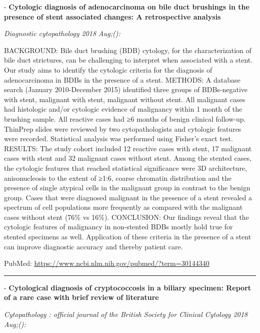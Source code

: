 \documentclass[]{article}
\begin{document}
 - \textbf{Cytologic diagnosis of adenocarcinoma on bile duct brushings
in the presence of stent associated changes: A retrospective analysis}

\emph{Diagnostic cytopathology 2018 Aug;():}

BACKGROUND: Bile duct brushing (BDB) cytology, for the characterization
of bile duct strictures, can be challenging to interpret when associated
with a stent. Our study aims to identify the cytologic criteria for the
diagnosis of adenocarcinoma in BDBs in the presence of a stent. METHODS:
A database search (January 2010-December 2015) identified three groups
of BDBs-negative with stent, malignant with stent, malignant without
stent. All malignant cases had histologic and/or cytologic evidence of
malignancy within 1 month of the brushing sample. All reactive cases had
≥6 months of benign clinical follow-up. ThinPrep slides were reviewed by
two cytopathologists and cytologic features were recorded. Statistical
analysis was performed using Fisher's exact test. RESULTS: The study
cohort included 12 reactive cases with stent, 17 malignant cases with
stent and 32 malignant cases without stent. Among the stented cases, the
cytologic features that reached statistical significance were 3D
architecture, anisonucleosis to the extent of ≥1:6, coarse chromatin
distribution and the presence of single atypical cells in the malignant
group in contrast to the benign group. Cases that were diagnosed
malignant in the presence of a stent revealed a spectrum of cell
populations more frequently as compared with the malignant cases without
stent (76\% vs 16\%). CONCLUSION: Our findings reveal that the cytologic
features of malignancy in non-stented BDBs mostly hold true for stented
specimens as well. Application of these criteria in the presence of a
stent can improve diagnostic accuracy and thereby patient care.

PubMed: \url{https://www.ncbi.nlm.nih.gov/pubmed/?term=30144340}

{}

{}

\begin{center}\rule{0.5\linewidth}{\linethickness}\end{center}

 - \textbf{Cytological diagnosis of cryptococcosis in a biliary
specimen: Report of a rare case with brief review of literature}

\emph{Cytopathology : official journal of the British Society for
Clinical Cytology 2018 Aug;():}
\end{document}
